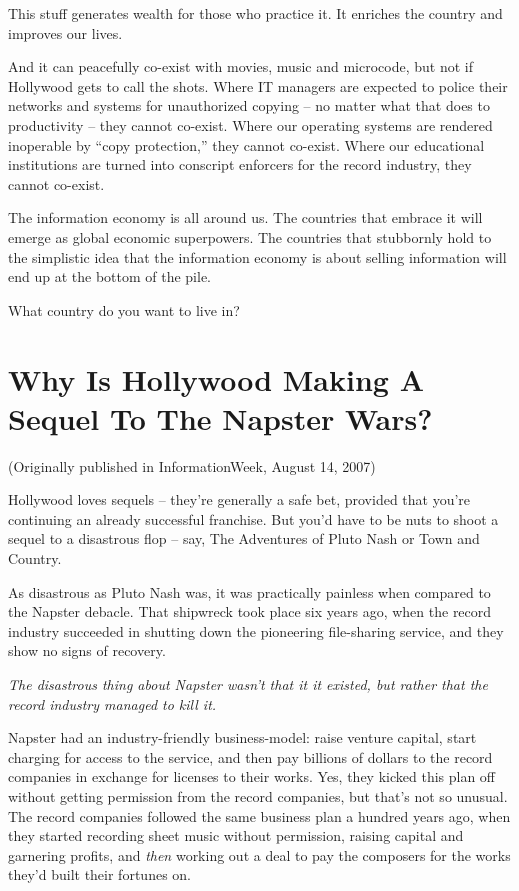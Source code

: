 This stuff generates wealth for those who practice it. It enriches
the country and improves our lives.

And it can peacefully co-exist with movies, music and microcode,
but not if Hollywood gets to call the shots. Where IT managers are
expected to police their networks and systems for unauthorized
copying -- no matter what that does to productivity -- they cannot
co-exist. Where our operating systems are rendered inoperable by
``copy protection,'' they cannot co-exist. Where our educational
institutions are turned into conscript enforcers for the record
industry, they cannot co-exist.

The information economy is all around us. The countries that
embrace it will emerge as global economic superpowers. The
countries that stubbornly hold to the simplistic idea that the
information economy is about selling information will end up at the
bottom of the pile.

What country do you want to live in?

\section{Why Is Hollywood Making A Sequel To The Napster Wars?}

(Originally published in InformationWeek, August 14, 2007)

Hollywood loves sequels -- they're generally a safe bet, provided
that you're continuing an already successful franchise. But you'd
have to be nuts to shoot a sequel to a disastrous flop -- say, The
Adventures of Pluto Nash or Town and Country.

As disastrous as Pluto Nash was, it was practically painless when
compared to the Napster debacle. That shipwreck took place six
years ago, when the record industry succeeded in shutting down the
pioneering file-sharing service, and they show no signs of
recovery.

\emph{The disastrous thing about Napster wasn't that it it existed, but rather that the record industry managed to kill it.}

Napster had an industry-friendly business-model: raise venture
capital, start charging for access to the service, and then pay
billions of dollars to the record companies in exchange for
licenses to their works. Yes, they kicked this plan off without
getting permission from the record companies, but that's not so
unusual. The record companies followed the same business plan a
hundred years ago, when they started recording sheet music without
permission, raising capital and garnering profits, and
\emph{then} working out a deal to pay the composers for the works
they'd built their fortunes on.

